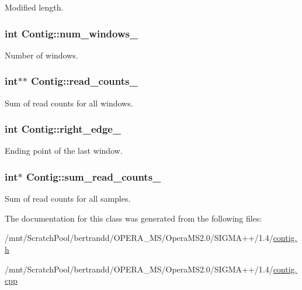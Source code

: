 \label{classContig_aa6684a56e15ee58bd476f540d374a533}
Modified length. \hypertarget{classContig_a79d35bdfd6b2150fad6de897e79707eb}{
\subsubsection[{num\_\-windows\_\-}]{\setlength{\rightskip}{0pt plus 5cm}int {\bf Contig::num\_\-windows\_\-}}}
\label{classContig_a79d35bdfd6b2150fad6de897e79707eb}
Number of windows. \hypertarget{classContig_acefd28d0aa305b2ab14be6e7df92aa5f}{
\subsubsection[{read\_\-counts\_\-}]{\setlength{\rightskip}{0pt plus 5cm}int$\ast$$\ast$ {\bf Contig::read\_\-counts\_\-}}}
\label{classContig_acefd28d0aa305b2ab14be6e7df92aa5f}
Sum of read counts for all windows. \hypertarget{classContig_ae519dc1dad2c15acc493931e84601416}{
\subsubsection[{right\_\-edge\_\-}]{\setlength{\rightskip}{0pt plus 5cm}int {\bf Contig::right\_\-edge\_\-}}}
\label{classContig_ae519dc1dad2c15acc493931e84601416}
Ending point of the last window. \hypertarget{classContig_aa612a7c9009a74dd27f8585c0685a7f1}{
\subsubsection[{sum\_\-read\_\-counts\_\-}]{\setlength{\rightskip}{0pt plus 5cm}int$\ast$ {\bf Contig::sum\_\-read\_\-counts\_\-}}}
\label{classContig_aa612a7c9009a74dd27f8585c0685a7f1}
Sum of read counts for all samples. 

The documentation for this class was generated from the following files:\begin{DoxyCompactItemize}
\item 
/mnt/ScratchPool/bertrandd/OPERA\_\-MS/OperaMS2.0/SIGMA++/1.4/\hyperlink{contig_8h}{contig.h}\item 
/mnt/ScratchPool/bertrandd/OPERA\_\-MS/OperaMS2.0/SIGMA++/1.4/\hyperlink{contig_8cpp}{contig.cpp}\end{DoxyCompactItemize}
